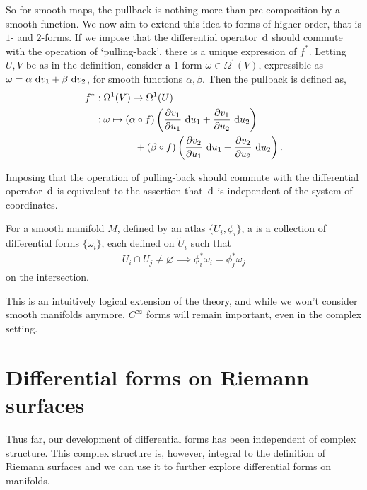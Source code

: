 So for smooth maps, the pullback is nothing more than pre-composition by a
smooth function. We now aim to extend this idea to forms of higher order, that
is $ 1 $- and $ 2 $-forms. If we impose that the differential operator $ \operatorname{\, d\!}{} $ should commute with the
operation of `pulling-back', there is a unique expression of $ f ^{*} $. Letting
$ U, V $ be as in the definition, consider a $ 1 $-form $ \omega \in \Omega^1(V)
$, expressible as $ \omega = \alpha \operatorname{\, d\!}{v_1} + \beta \operatorname{\, d\!}{v_2}$, for smooth
functions $ \alpha, \beta $. Then the pullback is defined as,
\begin{align*}
	f ^{*} & : \Omega^1(V) \to \Omega^1(U)                                        \\
	       & : \omega \mapsto \left( \alpha \circ f \right) \left( \frac{\partial
		v_1}{\partial u_1}\operatorname{\, d\!}{u_1} + \frac{\partial v_1}{\partial u_2}\operatorname{\, d\!}{u_2}
	\right)                                                                       \\
	       & \qquad\qquad + \left( \beta \circ f \right) \left( \frac{\partial
		v_2}{\partial u_1}\operatorname{\, d\!}{u_1} + \frac{\partial v_2}{\partial u_2}\operatorname{\, d\!}{u_2}
	\right).
\end{align*}

\begin{remark}
	Imposing that the operation of pulling-back should commute with the
	differential operator $ \operatorname{\, d\!}{} $ is equivalent to the assertion that $ \operatorname{\, d\!}{} $ is
	independent of the system of coordinates.
\end{remark}

\begin{definition}
	For a smooth manifold $ M $, defined by an atlas $ \{ U_i, \phi_i \} $, a
	 is a collection of differential
	forms $ \{ \omega_i \} $, each defined on $ \tilde{U} _{i} $ such that
	\begin{align*}
		U_i \cap U_j \neq \varnothing \implies \phi_i ^{*} \omega_i = \phi_j
		^{*}\omega_j
	\end{align*}
	on the intersection.
\end{definition}

This is an intuitively logical extension of the theory, and while we won't
consider smooth manifolds anymore, $ C ^{\infty} $ forms will remain important,
even in the complex setting.

\section{Differential forms on Riemann surfaces}
Thus far, our development of differential forms has been independent of complex
structure. This complex structure is, however, integral to the definition of
Riemann surfaces and we can use it to further explore differential forms on
manifolds.

